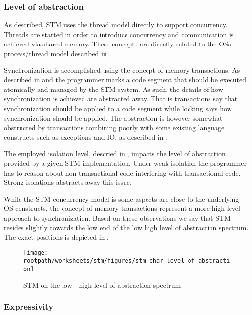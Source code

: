 \subsubsection{Level of abstraction}\label{sec:stm_level_of_abstraction}
As described, \ac{STM} uses the thread model directly to support concurrency. Threads are started in order to introduce concurrency and communication is achieved via shared memory. These concepts are directly related to the \acp{OS} process/thread model described in .

Synchronization is accomplished using the concept of memory transactions. As described in  and   the programmer marks a code segment that should be executed atomically and managed by the \ac{STM} system. As such, the details of how synchronization is achieved are abstracted away. That is transactions say that synchronization should be applied to a code segment while locking says how synchronization should be applied. The abstraction is however somewhat obstructed by transactions combining poorly with some existing language constructs such as exceptions and \ac{IO}, as described in \bsref{}.

The employed isolation level, descried in , impacts the level of abstraction provided by a given \ac{STM} implementation. Under weak isolation the programmer has to reason about non transactional code interfering with transactional code. Strong isolations abstracts away this issue.

While the \ac{STM} concurrency model is some aspects are close to the underlying \ac{OS} constructs, the concept of memory transactions represent a more high level approach to synchronization. Based on these observations we say that \ac{STM} resides slightly towards the low end of the low high level of abstraction spectrum. The exact positions is depicted in .

\begin{figure}[htbp]
\centering
 \texttt{[image: \\rootpath/worksheets/stm/figures/stm\_char\_level\_of\_abstraction]} 
 \caption{\ac{STM} on the low - high level of abstraction spectrum}
\label{fig:char_stm_level_of_abstraction}
\end{figure}

\subsubsection{Expressivity}\label{sec:stm_expressivity}

